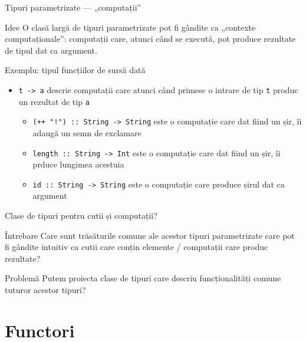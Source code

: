 \documentclass[xcolor=pdftex,romanian,colorlinks]{beamer}
\begin{document}
\begin{frame}[fragile]{Tipuri parametrizate --- „computații”}
\begin{block}{Idee}
O clasă largă de tipuri parametrizate pot fi gândite ca „contexte computaționale”: computații care, atunci când se execută, pot produce rezultate de tipul dat ca argument.
\end{block}
\begin{block}{Exemplu: tipul funcțiilor de sursă dată}
\begin{itemize}
\item \lstinline$t -> a$ descrie computații care atunci când primesc o intrare de tip \lstinline$t$ produc un rezultat de tip \lstinline$a$
\begin{itemize}
\item \lstinline$(++ "!") :: String -> String$ este o computație care dat fiind un șir, îi adaugă un semn de exclamare
\item \lstinline$length :: String -> Int$ este o computație care dat fiind un șir, îi prduce lungimea acestuia
\item \lstinline$id :: String -> String$ este o computație care produce șirul dat ca argument
\end{itemize}
\end{itemize}
\end{block}
\end{frame}

\begin{frame}[fragile]{Clase de tipuri pentru cutii și computații?}
\begin{block}{Întrebare}
Care sunt trăsăturile comune ale acestor tipuri parametrizate care pot fi gândite intuitiv ca cutii care conțin elemente / computații care produc rezultate?
\end{block}
\vfill
\begin{block}{Problemă}
Putem proiecta clase de tipuri care descriu funcționalități comune tuturor acestor tipuri?
\end{block}
\end{frame}

\section{Functori}
\end{document}
